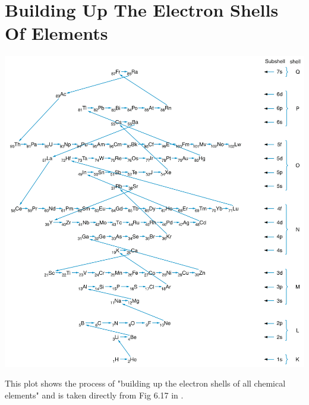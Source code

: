\documentclass[openany,twoside, notitlepage,letterpaper,11pt]{book}
\begin{document}
\section{Building Up The Electron Shells Of Elements}
\begin{center}
	\includegraphics[scale=1]{./Images/Diagrams/electronshell.png}
	
	This plot shows the process of "building up the electron shells of all chemical elements" and is taken directly from Fig 6.17 in \cite{Demtroder}.
\end{center}











\backmatter

\printindex
\end{document}
